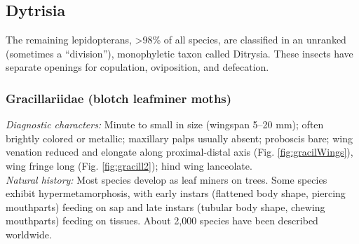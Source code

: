 \documentclass[letterpaper, 11pt]{article}
\begin{document}
\subsection{Dytrisia}
The remaining lepidopterans, \textgreater98\% of all species, are classified in an unranked (sometimes a ``division''), monophyletic taxon called Ditrysia. These insects have separate openings for copulation, oviposition, and defecation.

\subsubsection{Gracillariidae (blotch leafminer moths)}
\noindent{}\textit{Diagnostic characters:} Minute to small in size (wingspan 5--20 mm); often brightly colored or metallic; maxillary palps usually absent; proboscis bare; wing venation reduced and elongate along proximal-distal axis (Fig. \ref{fig:gracilWings}), wing fringe long (Fig. \ref{fig:gracill2}); hind wing lanceolate.\\

\noindent{}\textit{Natural history:} Most species develop as leaf miners on trees. Some species exhibit hypermetamorphosis, with early instars (flattened body shape, piercing mouthparts) feeding on sap and late instars (tubular body shape, chewing mouthparts) feeding on tissues. About 2,000 species have been described worldwide.
\end{document}
